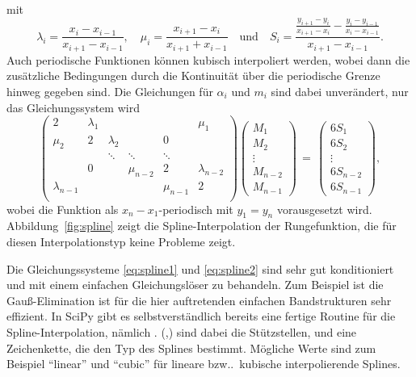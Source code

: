 mit
\begin{equation}
  \lambda_i = \frac{x_i - x_{i-1}}{x_{i+1} - x_{i-1}},\quad
  \mu_i = \frac{x_{i+1}-x_i}{x_{i+1} + x_{i-1}}\quad\text{und}\quad
  S_i = \frac{\frac{y_{i+1}-y_i}{x_{i+1} -
      x_i} - \frac{y_i-y_{i-1}}{x_i - x_{i-1}}}{x_{i+1}-x_{i-1}}.
\end{equation}
Auch periodische Funktionen können kubisch interpoliert werden, wobei
dann die zusätzliche Bedingungen durch die Kontinuität über die periodische
Grenze hinweg gegeben sind. Die Gleichungen für $\alpha_i$ und $m_i$
sind dabei unverändert, nur das Gleichungssystem wird
\begin{equation}
  \label{eq:spline2}
  \begin{pmatrix}
    2      & \lambda_1 &           &           &           &      \mu_1 \\
    \mu_2  & 2         & \lambda_2 &           & 0\\
           &           & \ddots    & \ddots    & \ddots \\
           & 0          &           & \mu_{n-2}  & 2         & \lambda_{n-2} \\
    \lambda_{n-1} &           &           &           & \mu_{n-1}  & 2         \\
  \end{pmatrix}
  \begin{pmatrix}
    M_1\\
    M_2\\
    \vdots\\
    M_{n-2}\\
    M_{n-1}
  \end{pmatrix} \,=\,
  \begin{pmatrix}
    6S_1\\
    6S_2\\
    \vdots\\
    6S_{n-2} \\
    6S_{n-1}
  \end{pmatrix},
\end{equation}
wobei die Funktion als $x_n-x_1$-periodisch mit $y_1=y_n$
vorausgesetzt wird. Abbildung~\ref{fig:spline} zeigt die
Spline-Interpolation der Rungefunktion, die für diesen
Interpolationstyp keine Probleme zeigt.

Die Gleichungssysteme \eqref{eq:spline1} und \eqref{eq:spline2} sind
sehr gut konditioniert und mit einem einfachen Gleichungslöser zu
behandeln.  Zum Beispiel ist die Gauß-Elimination ist für die hier
auftretenden einfachen Bandstrukturen sehr effizient. In SciPy gibt es
selbstverständlich bereits eine fertige Routine für die
Spline-Interpolation, nämlich . (,) sind dabei die Stützstellen, und
 eine Zeichenkette, die den Typ des Splines
bestimmt. Mögliche Werte sind zum Beispiel "`linear"' und "`cubic"'
für lineare bzw..\ kubische interpolierende Splines.

